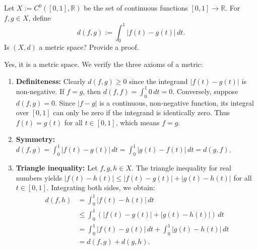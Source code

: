 \begin{exercise}[$L^1$-metric]
\label{ex:integral_metric_is_metric}
Let $X := C^0([0,1], \mathbb{R})$ be the set of continuous functions $[0,1] \to \mathbb{R}$.
For $f,g \in X$, define
\[d(f,g) := \int_0^1 \lvert f(t)-g(t)\rvert\,dt.\]
Is $(X,d)$ a metric space? Provide a proof.
\end{exercise}

\begin{exercisesolution}
Yes, it is a metric space. We verify the three axioms of a metric:
\begin{enumerate}[label=\textbf{(\alph*)}]
  \item \textbf{Definiteness:} Clearly $d(f,g) \geq 0$ since the integrand $\lvert f(t)-g(t)\rvert$ is non-negative. If $f = g$, then $d(f,f) = \int_0^1 0\,dt = 0$. Conversely, suppose $d(f,g) = 0$. Since $\lvert f-g\rvert$ is a continuous, non-negative function, its integral over $[0,1]$ can only be zero if the integrand is identically zero. Thus $f(t) = g(t)$ for all $t \in [0,1]$, which means $f = g$.
  \item \textbf{Symmetry:} $d(f,g) = \int_0^1 \lvert f(t)-g(t)\rvert\,dt = \int_0^1 \lvert g(t)-f(t)\rvert\,dt = d(g,f)$.
  \item \textbf{Triangle inequality:} Let $f, g, h \in X$. The triangle inequality for real numbers yields $\lvert f(t)-h(t)\rvert \leq \lvert f(t)-g(t)\rvert + \lvert g(t)-h(t)\rvert$ for all $t \in [0,1]$. Integrating both sides, we obtain:
  \begin{align*}
  d(f,h) &= \int_0^1 \lvert f(t)-h(t)\rvert\,dt \\
  &\leq \int_0^1 \left(\lvert f(t)-g(t)\rvert + \lvert g(t)-h(t)\rvert\right)\,dt \\
  &= \int_0^1 \lvert f(t)-g(t)\rvert\,dt + \int_0^1 \lvert g(t)-h(t)\rvert\,dt \\
  &= d(f,g) + d(g,h).
  \end{align*}
\end{enumerate}
\end{exercisesolution}



